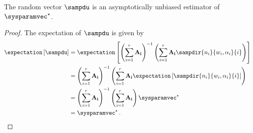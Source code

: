 \documentclass[ ../main.tex]{subfiles}
\begin{document}
\begin{theorem}
The random vector $\sampdu$ is an asymptotically unbiased estimator of $\tparam\sysparamvec$.
\end{theorem}
\begin{proof}
The expectation of $\sampdu$ is given by
\begin{align}
    \expectation\left[\sampdu\right]
    &= \expectation\left[\left( \sum_{i=1}^{r} \matrx{A_i} \right)^{-1} \left( \sum_{i=1}^{r} \matrx{A_i} \sampdir{n_i}{w_i,\alpha_i}{i} \right)\right]\\
    &=  \left( \sum_{i=1}^{r} \matrx{A_i} \right)^{-1}
            \left( \sum_{i=1}^{r} \matrx{A_i}
            \expectation\left[\sampdir{n_i}{w_i,\alpha_i}{i}\right]\right)\\    
    &= \left( \sum_{i=1}^{r} \matrx{A_i} \right)^{-1} \left(\sum_{i=1}^{r} \matrx{A_i} \right) \tparam\sysparamvec\\
    &= \tparam\sysparamvec\,.
\end{align}
\end{proof}
\end{document}
